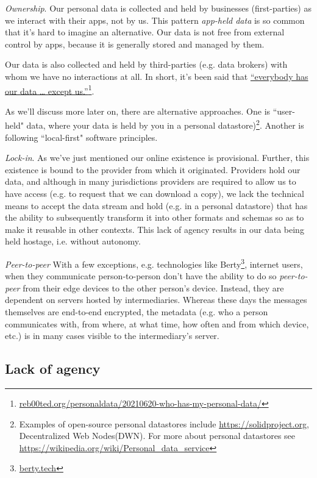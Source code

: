 \documentclass[11pt, oneside]{article}   	%
\newcommand{\hyperfootnote}[1][]{\def\ArgI{{#1}}\hyperfootnoteRelay}
\newcommand\hyperfootnoteRelay[2][]{\href{#1#2}{\ArgI}\footnote{\href{#1#2}{#2}}}
\begin{document}
\emph{Ownership}. Our personal data is collected and held by businesses (first-parties) as we interact with their apps, not by us. This pattern \emph{app-held data} is so common that it's hard to imagine an alternative. Our data is not free from external control by apps, because it is generally stored and managed by them. 

Our data is also collected and held by third-parties (e.g. data brokers) with whom we have no interactions at all. In short, it's been said that \hyperfootnote[“everybody has our data … except us.”][https://]{reb00ted.org/personaldata/20210620-who-has-my-personal-data/}. 

As we'll discuss more later on, there are alternative approaches. One is ``user-held" data\cite{Jurcys2021}, where your data is held by you in a personal datastore)\footnote{Examples of open-source personal datastores include \url{https://solidproject.org}, Decentralized Web Nodes(DWN). For more about personal datastores see \url{https://wikipedia.org/wiki/Personal\_data\_service}}. Another is following ``local-first" software principles.\cite{Kleppmann2019}

\emph{Lock-in}. As we've just mentioned our online existence is provisional. Further, this existence is bound to the provider from which it originated. Providers hold our data, and although in many jurisdictions providers are required to allow us to have access (e.g. to request that we can download a copy), we lack the technical means to accept the data stream and hold (e.g. in a personal datastore) that has the ability to subsequently transform it into other formats and schemas so as to make it reusable in other contexts. This lack of agency results in our data being held hostage, i.e. without autonomy. 

\emph{Peer-to-peer} With a few exceptions, e.g. technologies like Berty\hyperfootnote[][https://]{berty.tech}, internet users, when they communicate person-to-person don't have the ability to do so \emph{peer-to-peer} from their edge devices to the other person's device. Instead, they are dependent on servers hosted by intermediaries. Whereas these days the messages themselves are end-to-end encrypted, the metadata (e.g. who a person communicates with, from where, at what time, how often and from which device, etc.) is in many cases visible to the intermediary's server. 

\subsection{Lack of agency}
\end{document}
